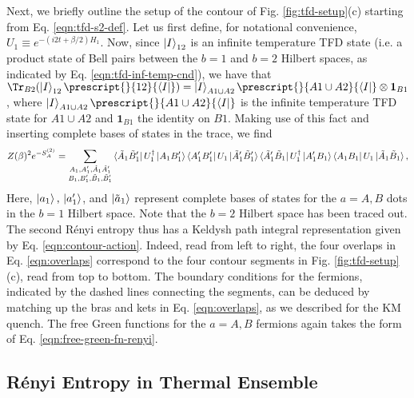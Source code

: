 \documentclass[reprint, floatfix,eqsecnum,superscriptaddress,preprint,nofootinbib,onecolumn,amsmath,amssymb,aps,prb]{revtex4-2}
\begin{document}
Next, we briefly outline the setup of the contour of Fig. \ref{fig:tfd-setup}(c) starting from
Eq. \eqref{eqn:tfd-s2-def}.
Let us first define, for notational convenience, $U_1 \equiv e^{-(i2t+\beta/2)H_1}$. 
Now, since $\ket{I}_{12}$ is an infinite temperature TFD state (i.e. a product state of Bell pairs between the $b=1$ and $b=2$ Hilbert spaces, as indicated by Eq. \eqref{eqn:tfd-inf-temp-cnd}), we have that  $\Tr_{B2} (\ket{I}_{12} \prescript{}{12}{\bra{I}}) = \ket{I}_{A1\cup A2} \prescript{}{A1\cup A2}{\bra{I}} \otimes \mathbf{1}_{B1}$, where $\ket{I}_{A1\cup A2} \prescript{}{A1\cup A2}{\bra{I}}$ is the infinite temperature TFD state for $A1\cup A2$ and $\mathbf{1}_{B1}$ the identity on $B1$. Making use of this fact and inserting complete bases of states in the trace, we find 
\begin{align}
    \begin{split}
	Z(\beta)^2 e^{-S^{(2)}_A} = \sum_{\substack{A_1, A_1' , \tilde{A}_1 \tilde{A}_1'  \\ B_1, B_1' , 
	\tilde{B}_1 , \tilde{B}'_1 }}  \bra{\tilde{A}_1  \tilde{B}'_1}  U_1^\dagger \ket{A_1 B_1'} \bra{A_1' B_1'} U_1 \ket{\tilde{A}_1' \tilde{B}_1'} \bra{\tilde{A}_1 ' \tilde{B}_1}  U_1^\dagger \ket{A_1' B_1} \bra{A_1 B_1} U_1 \ket{\tilde{A}_1 \tilde{B}_1} ,
	\end{split}
	\label{eqn:overlaps}
\end{align}
Here, $\ket{a_1}, \, \ket{a'_1}$, and $\ket{\tilde{a}_1}$ represent complete bases of states for the $a=A,B$ dots in the $b=1$ Hilbert space.
Note that the $b=2$ Hilbert space has been traced out. The second R\'enyi entropy thus has a Keldysh path integral representation given by Eq. \eqref{eqn:contour-action}.  Indeed, read from left to right, the four overlaps in Eq. \eqref{eqn:overlaps} correspond to the four contour segments in Fig. \ref{fig:tfd-setup}(c), read from top to bottom. The boundary conditions for the fermions, indicated by the dashed lines connecting the segments, can be deduced by matching up the bras and kets in Eq. \eqref{eqn:overlaps}, as we described for the KM quench. The free Green functions for the $a=A,B$ fermions again takes the form of Eq. \eqref{eqn:free-green-fn-renyi}.



\subsection{R\'enyi Entropy in Thermal Ensemble}
\end{document}
